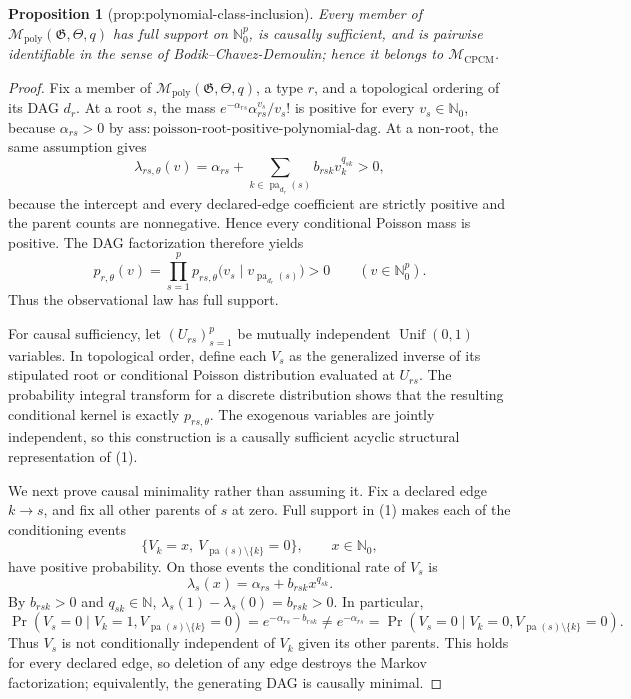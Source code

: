 \documentclass{article}
\newtheorem{proposition}{Proposition}
\begin{document}
\begin{proposition}[prop:polynomial-class-inclusion]\label{prop:polynomial-class-inclusion}
Every member of \(\mathcal M_{\mathrm{poly}}(\mathfrak G,\Theta,q)\) has full support on \(\mathbb N_0^p\), is causally sufficient, and is pairwise identifiable in the sense of Bodik--Chavez-Demoulin; hence it belongs to \(\mathcal M_{\mathrm{CPCM}}\).
\end{proposition}
\begin{proof}
Fix a member of \(\mathcal M_{\mathrm{poly}}(\mathfrak G,\Theta,q)\), a type \(r\), and a topological ordering of its DAG \(d_r\).  At a root \(s\), the mass \(e^{-\alpha_{rs}}\alpha_{rs}^{v_s}/v_s!\) is positive for every \(v_s\in\mathbb N_0\), because \(\alpha_{rs}>0\) by \(\mathrm{ass{:}poisson\text{-}root\text{-}positive\text{-}polynomial\text{-}dag}\).  At a non-root, the same assumption gives
\[
\lambda_{rs,\theta}(v)=\alpha_{rs}+
\sum_{k\in\operatorname{pa}_{d_r}(s)}b_{rsk}v_k^{q_{sk}}>0,
\]
because the intercept and every declared-edge coefficient are strictly positive and the parent counts are nonnegative.  Hence every conditional Poisson mass is positive.  The DAG factorization therefore yields
\[
 p_{r,\theta}(v)=\prod_{s=1}^{p}
 p_{rs,\theta}\bigl(v_s\mid v_{\operatorname{pa}_{d_r}(s)}\bigr)>0
 \qquad(v\in\mathbb N_0^p). \tag{1}
\]
Thus the observational law has full support.

For causal sufficiency, let \((U_{rs})_{s=1}^p\) be mutually independent \(\operatorname{Unif}(0,1)\) variables.  In topological order, define each \(V_s\) as the generalized inverse of its stipulated root or conditional Poisson distribution evaluated at \(U_{rs}\).  The probability integral transform for a discrete distribution shows that the resulting conditional kernel is exactly \(p_{rs,\theta}\).  The exogenous variables are jointly independent, so this construction is a causally sufficient acyclic structural representation of (1).

We next prove causal minimality rather than assuming it.  Fix a declared edge \(k\to s\), and fix all other parents of \(s\) at zero.  Full support in (1) makes each of the conditioning events
\[
 \{V_k=x,\ V_{\operatorname{pa}(s)\setminus\{k\}}=0\},
 \qquad x\in\mathbb N_0,
\]
have positive probability.  On those events the conditional rate of \(V_s\) is
\[
 \lambda_s(x)=\alpha_{rs}+b_{rsk}x^{q_{sk}}. \tag{2}
\]
By \(b_{rsk}>0\) and \(q_{sk}\in\mathbb N\),
\(\lambda_s(1)-\lambda_s(0)=b_{rsk}>0\).  In particular,
\[
 \Pr(V_s=0\mid V_k=1,V_{\operatorname{pa}(s)\setminus\{k\}}=0)
 =e^{-\alpha_{rs}-b_{rsk}}
 \ne e^{-\alpha_{rs}}
 =\Pr(V_s=0\mid V_k=0,V_{\operatorname{pa}(s)\setminus\{k\}}=0). \tag{3}
\]
Thus \(V_s\) is not conditionally independent of \(V_k\) given its other parents.  This holds for every declared edge, so deletion of any edge destroys the Markov factorization; equivalently, the generating DAG is causally minimal.


\end{proof}
\end{document}
